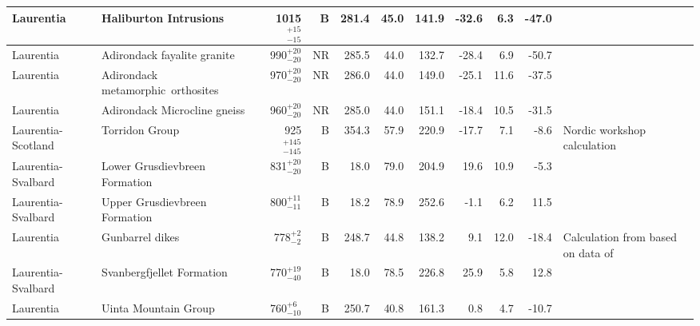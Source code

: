 \documentclass[twocolumn, switch]{article} %
\begin{document}
{\begin{landscape}
\begin{ThreePartTable}
\begin{longtable}{p{1.4 in}p{1.2 in}rrrrrrrrp{1.2 in}}
                     Laurentia &                              Haliburton Intrusions &   1015$^{+15}_{-15}$ &      B &     281.4 &      45.0 & 141.9 & -32.6 &       6.3 &       -47.0 &                                \cite{Warnock2000a} \\ \hline
                     Laurentia &                        Adirondack fayalite granite &    990$^{+20}_{-20}$ &     NR &     285.5 &      44.0 & 132.7 & -28.4 &       6.9 &       -50.7 &                                  \cite{Brown2012a} \\ \hline
                     Laurentia &               Adirondack metamorphic\ orthosites &    970$^{+20}_{-20}$ &     NR &     286.0 &      44.0 & 149.0 & -25.1 &      11.6 &       -37.5 &                                  \cite{Brown2012a} \\ \hline
                     Laurentia &                       Adirondack Microcline gneiss &    960$^{+20}_{-20}$ &     NR &     285.0 &      44.0 & 151.1 & -18.4 &      10.5 &       -31.5 &                                  \cite{Brown2012a} \\ \hline
            Laurentia-Scotland &                                     Torridon Group &  925$^{+145}_{-145}$ &      B &     354.3 &      57.9 & 220.9 & -17.7 &       7.1 &        -8.6 &                        Nordic workshop calculation \\ \hline
            Laurentia-Svalbard &                      Lower Grusdievbreen Formation &    831$^{+20}_{-20}$ &      B &      18.0 &      79.0 & 204.9 &  19.6 &      10.9 &        -5.3 &                                 \cite{Maloof2006a} \\ \hline
            Laurentia-Svalbard &                      Upper Grusdievbreen Formation &    800$^{+11}_{-11}$ &      B &      18.2 &      78.9 & 252.6 &  -1.1 &       6.2 &        11.5 &                                 \cite{Maloof2006a} \\ \hline
                     Laurentia &                                    Gunbarrel dikes &      778$^{+2}_{-2}$ &      B &     248.7 &      44.8 & 138.2 &   9.1 &      12.0 &       -18.4 &  Calculation from \cite{Eyster2020a} based on data of \cite{Harlan1993a, Harlan1997a} \\ \hline
            Laurentia-Svalbard &                          Svanbergfjellet Formation &    770$^{+19}_{-40}$ &      B &      18.0 &      78.5 & 226.8 &  25.9 &       5.8 &        12.8 &                                 \cite{Maloof2006a} \\ \hline
                     Laurentia &                               Uinta Mountain Group &     760$^{+6}_{-10}$ &      B &     250.7 &      40.8 & 161.3 &   0.8 &       4.7 &       -10.7 &                                   \cite{Weil2006b} \\ \hline

\end{longtable}
\end{ThreePartTable}
\end{landscape}}
\end{document}
